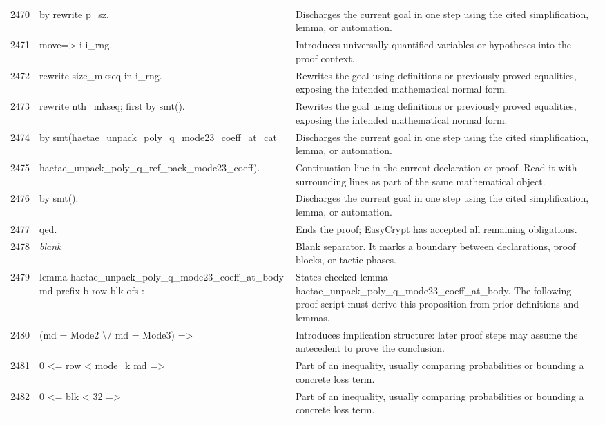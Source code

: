 \documentclass[10pt]{article}
\begin{document}
\begin{longtable}{r L{0.53\textwidth} L{0.37\textwidth}}
2470 & {\ttfamily\scriptsize     by rewrite p\_sz.} & Discharges the current goal in one step using the cited simplification, lemma, or automation. \\
2471 & {\ttfamily\scriptsize   move=> i i\_rng.} & Introduces universally quantified variables or hypotheses into the proof context. \\
2472 & {\ttfamily\scriptsize   rewrite size\_mkseq in i\_rng.} & Rewrites the goal using definitions or previously proved equalities, exposing the intended mathematical normal form. \\
2473 & {\ttfamily\scriptsize   rewrite nth\_mkseq; first by smt().} & Rewrites the goal using definitions or previously proved equalities, exposing the intended mathematical normal form. \\
2474 & {\ttfamily\scriptsize   by smt(haetae\_unpack\_poly\_q\_mode23\_coeff\_at\_cat} & Discharges the current goal in one step using the cited simplification, lemma, or automation. \\
2475 & {\ttfamily\scriptsize          haetae\_unpack\_poly\_q\_ref\_pack\_mode23\_coeff).} & Continuation line in the current declaration or proof.  Read it with surrounding lines as part of the same mathematical object. \\
2476 & {\ttfamily\scriptsize by smt().} & Discharges the current goal in one step using the cited simplification, lemma, or automation. \\
2477 & {\ttfamily\scriptsize qed.} & Ends the proof; EasyCrypt has accepted all remaining obligations. \\
2478 & {\ttfamily\scriptsize \emph{blank}} & Blank separator.  It marks a boundary between declarations, proof blocks, or tactic phases. \\
2479 & {\ttfamily\scriptsize lemma haetae\_unpack\_poly\_q\_mode23\_coeff\_at\_body md prefix b row blk ofs :} & States checked lemma haetae\_unpack\_poly\_q\_mode23\_coeff\_at\_body.  The following proof script must derive this proposition from prior definitions and lemmas. \\
2480 & {\ttfamily\scriptsize   (md = Mode2 \textbackslash{}/ md = Mode3) =>} & Introduces implication structure: later proof steps may assume the antecedent to prove the conclusion. \\
2481 & {\ttfamily\scriptsize   0 <= row < mode\_k md =>} & Part of an inequality, usually comparing probabilities or bounding a concrete loss term. \\
2482 & {\ttfamily\scriptsize   0 <= blk < 32 =>} & Part of an inequality, usually comparing probabilities or bounding a concrete loss term. \\

\end{longtable}
\end{document}

